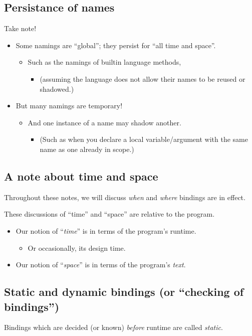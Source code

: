 \documentclass[11pt]{article}
\theoremstyle{definition}
\begin{document}
\subsection{Persistance of names}
\label{sec:org5c0fe15}
Take note!
\begin{itemize}
\item Some namings are “global”; they persist for “all time and space”.
\begin{itemize}
\item Such as the namings of builtin language methods,
\begin{itemize}
\item (assuming the language does not allow their names to be reused
or shadowed.)
\end{itemize}
\end{itemize}
\item But many namings are temporary!
\begin{itemize}
\item And one instance of a name may shadow another.
\begin{itemize}
\item (Such as when you declare a local variable/argument
with the same name as one already in scope.)
\end{itemize}
\end{itemize}
\end{itemize}

\subsection{A note about time and space}
\label{sec:org7eb2818}
Throughout these notes, we will discuss \emph{when} and \emph{where} bindings
are in effect.

These discussions of “time” and “space” are relative to the program.
\begin{itemize}
\item Our notion of “\emph{time}” is in terms of the program's runtime.
\begin{itemize}
\item Or occasionally, its design time.
\end{itemize}
\item Our notion of “\emph{space}” is in terms of the program's \emph{text}.
\end{itemize}

\subsection{Static and dynamic bindings (or “checking of bindings”)}
\label{sec:org5d50d34}
Bindings which are decided (or known) \emph{before} runtime
are called \emph{static}.
\end{document}
